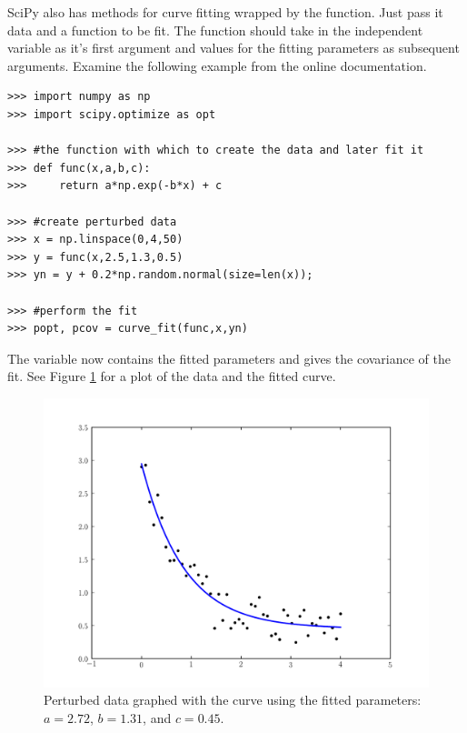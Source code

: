 SciPy also has methods for curve fitting wrapped by the  function.
Just pass it data and a function to be fit. The function should take in the independent variable as it's first argument and
values for the fitting parameters as subsequent arguments.
Examine the following example from the online documentation.
\begin{lstlisting}
>>> import numpy as np
>>> import scipy.optimize as opt

>>> #the function with which to create the data and later fit it
>>> def func(x,a,b,c):
>>>     return a*np.exp(-b*x) + c

>>> #create perturbed data
>>> x = np.linspace(0,4,50)
>>> y = func(x,2.5,1.3,0.5)
>>> yn = y + 0.2*np.random.normal(size=len(x));

>>> #perform the fit
>>> popt, pcov = curve_fit(func,x,yn)
\end{lstlisting}
The variable  now contains the fitted parameters and  gives the covariance of the fit.
See Figure \ref{opt:curve_fit} for a plot of the data and the fitted curve.

\begin{figure}
\includegraphics[width=\textwidth]{curve_fit.pdf}
\caption{Perturbed data graphed with the curve using the fitted parameters: $a=2.72$,  $b=1.31$, and $c=0.45$.}
\label{opt:curve_fit}
\end{figure}

